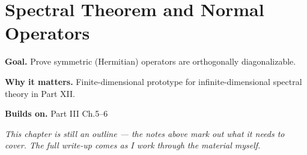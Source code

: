 \chapter{Spectral Theorem and Normal Operators}
\label{ch:03-linear-algebra-07}

\begin{chapterintro}
\textbf{Goal.} Prove symmetric (Hermitian) operators are orthogonally diagonalizable.

\textbf{Why it matters.} Finite-dimensional prototype for infinite-dimensional spectral theory in Part XII.

\textbf{Builds on.} Part III Ch.5–6
\end{chapterintro}

\textit{This chapter is still an outline --- the notes above mark out what it needs to cover. The full write-up comes as I work through the material myself.}
